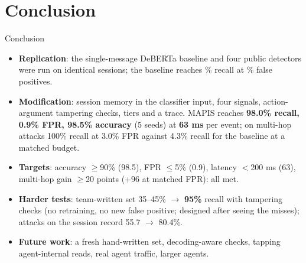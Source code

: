 \documentclass[aspectratio=169,10pt]{beamer}
\begin{document}
\section{Conclusion}
\begin{frame}{Conclusion}
  \begin{itemize}
    \item \textbf{Replication}: the single-message DeBERTa baseline and four public detectors were run on identical sessions; the baseline reaches \NSLRec\% recall at \NSLFpr\% false positives.
    \item \textbf{Modification}: session memory in the classifier input, four signals, action-argument tampering checks, tiers and a trace. MAPIS reaches \textbf{98.0\% recall, 0.9\% FPR, 98.5\% accuracy} (5 seeds) at \textbf{63 ms} per event; on multi-hop attacks 100\% recall at 3.0\% FPR against 4.3\% recall for the baseline at a matched budget.
    \item \textbf{Targets}: accuracy $\ge$90\% (98.5), FPR $\le$5\% (0.9), latency $<$200 ms (63), multi-hop gain $\ge$20 points (+96 at matched FPR): all met.
    \item \textbf{Harder tests}: team-written set 35--45\% $\rightarrow$ \textbf{95\%} recall with tampering checks (no retraining, no new false positive; designed after seeing the misses); attacks on the session record 55.7 $\rightarrow$ 80.4\%.
    \item \textbf{Future work}: a fresh hand-written set, decoding-aware checks, tapping agent-internal reads, real agent traffic, larger agents.
  \end{itemize}
\end{frame}
\end{document}
